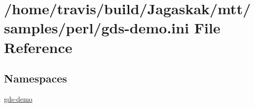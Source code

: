 \hypertarget{gds-demo_8ini}{\section{/home/travis/build/\-Jagaskak/mtt/samples/perl/gds-\/demo.ini File Reference}
\label{gds-demo_8ini}
}
\subsection*{Namespaces}
\begin{DoxyCompactItemize}
\item 
\hyperlink{namespacegds-demo}{gds-\/demo}
\end{DoxyCompactItemize}
